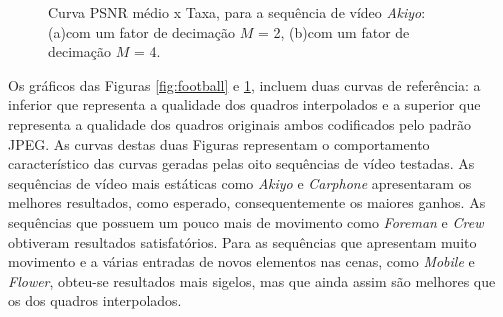 \begin{figure}[H]
	\centering
	\caption{Curva PSNR médio x Taxa, para a sequência de vídeo \textit{Akiyo}: (a)com um fator de decimação $M$ = 2, (b)com um fator de decimação $M$ = 4.}
	\label{fig:akiyo}
\end{figure}

Os gráficos das Figuras \ref{fig:football} e \ref{fig:akiyo}, incluem duas curvas de referência: a inferior que representa a qualidade dos quadros interpolados e a superior que representa a qualidade dos quadros originais ambos codificados pelo padrão JPEG. As curvas destas duas Figuras representam o comportamento característico das curvas geradas pelas oito sequências de vídeo testadas. As sequências de vídeo mais estáticas como \textit{Akiyo} e \textit{Carphone} apresentaram os melhores resultados, como esperado, consequentemente os maiores ganhos. As sequências que possuem um pouco mais de movimento como \textit{Foreman} e \textit{Crew} obtiveram resultados satisfatórios. Para as sequências que apresentam muito movimento e a várias entradas de novos elementos nas cenas, como \textit{Mobile} e \textit{Flower}, obteu-se resultados mais sigelos, mas que ainda assim são melhores que os dos quadros interpolados.

